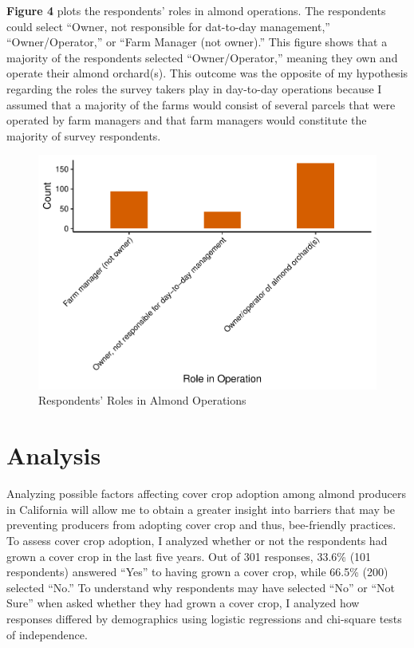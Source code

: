 \documentclass[12pt,]{article}
\begin{document}
\textbf{Figure 4} plots the respondents' roles in almond operations. The
respondents could select ``Owner, not responsible for dat-to-day
management,'' ``Owner/Operator,'' or ``Farm Manager (not owner).'' This
figure shows that a majority of the respondents selected
``Owner/Operator,'' meaning they own and operate their almond
orchard(s). This outcome was the opposite of my hypothesis regarding the
roles the survey takers play in day-to-day operations because I assumed
that a majority of the farms would consist of several parcels that were
operated by farm managers and that farm managers would constitute the
majority of survey respondents.

\begin{figure}
\centering
\includegraphics{Project_Template_files/figure-latex/Role in Operation-1.pdf}
\caption{Respondents' Roles in Almond Operations}
\end{figure}

\newpage

\section{Analysis}\label{analysis}

Analyzing possible factors affecting cover crop adoption among almond
producers in California will allow me to obtain a greater insight into
barriers that may be preventing producers from adopting cover crop and
thus, bee-friendly practices. To assess cover crop adoption, I analyzed
whether or not the respondents had grown a cover crop in the last five
years. Out of 301 responses, 33.6\% (101 respondents) answered ``Yes''
to having grown a cover crop, while 66.5\% (200) selected ``No.'' To
understand why respondents may have selected ``No'' or ``Not Sure'' when
asked whether they had grown a cover crop, I analyzed how responses
differed by demographics using logistic regressions and chi-square tests
of independence.
\end{document}
